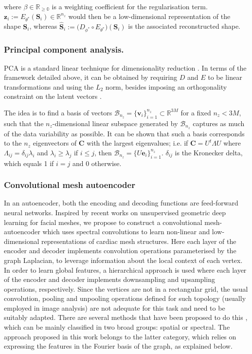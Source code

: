 \noindent where $\beta\in\mathbb{R_{\geq 0}}$ is a weighting coefficient for the regularisation term. $\textbf{z}_i:= E_{\theta^*}  (\textbf{S}_i)\in\mathbb{R}^{n_z}$ would then be a low-dimensional representation of the shape $\textbf{S}_i$, whereas $\hat{\textbf{S}}_i:=\big(D_{\phi^*} \circ E_{\theta^*}\big)(\textbf{S}_i)$ is the associated reconstructed shape.

\subsubsection{Principal component analysis.}
PCA is a standard linear technique for dimensionality reduction \cite{pearson_pca}. In terms of the framework detailed above, it can be obtained by requiring $D$ and $E$ to be linear transformations and using the $L_2$ norm, besides imposing an orthogonality constraint on the latent vectors \cite{goodfellow-et-al-2016}.

The idea is to find a basis of vectors  $\mathcal{B}_{n_z}=\{\textbf{v}_i\}_{i=1}^{n_z}\subset\mathbb{R}^{3M}$
for a fixed $n_z < 3M$, such that the $n_z$-dimensional linear subspace generated by $\mathcal{B}_{n_z}$ captures as much of the data variability as possible. It can be shown that such a basis corresponds to the $n_z$ eigenvectors of  $\textbf{C}$ with the largest eigenvalues; i.e. if $\textbf{C}=U^{t}\Lambda U$ where $\Lambda_{ij}=\delta_{ij}\lambda_i$ and $\lambda_i \geq \lambda_j$ if $i\leq j$, then $\mathcal{B}_{n_z}=\{{U\textbf{e}_i}\}_{i=1}^{n_z}$.
$\delta_{ij}$ is the Kronecker delta, which equals 1 if $i=j$ and 0 otherwise.

\subsubsection{Convolutional mesh autoencoder}
In an autoencoder, both the encoding and decoding functions are feed-forward neural networks.
Inspired by recent works on unsupervised geometric deep learning \cite{ref_coma} for facial meshes, we propose to construct a convolutional mesh-autoencoder which uses spectral convolutions \cite{ref_spectral_graph_conv} to learn non-linear and low-dimensional representations of cardiac mesh structures. Here each layer of the encoder and decoder implements convolution operations parameterised by the graph Laplacian, to leverage information about the local context of each vertex. In order to learn global features, a hierarchical approach is used where each layer of the encoder and decoder implements downsampling and upsampling operations, respectively. 
Since the vertices are not in a rectangular grid, the usual convolution, pooling and unpooling operations defined for such topology (usually employed in image analysis) are not adequate for this task and need to be suitably adapted. There are several methods that have been proposed to do this \cite{ref_bronstein_geom_DL}, which can be mainly classified in two broad groups: spatial or spectral. The approach proposed in this work belongs to the latter category, which relies on expressing the features in the Fourier basis of the graph, as explained below.

